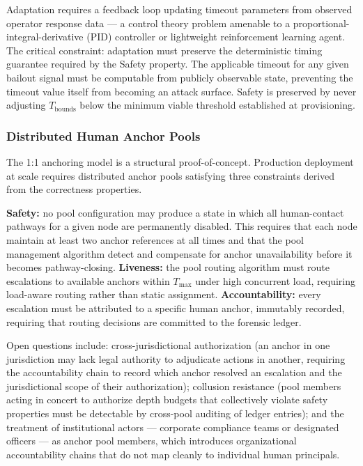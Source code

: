 Adaptation requires a feedback loop updating timeout parameters from observed operator response data --- a control theory problem amenable to a proportional-integral-derivative (PID) controller or lightweight reinforcement learning agent. The critical constraint: adaptation must preserve the deterministic timing guarantee required by the Safety property. The applicable timeout for any given bailout signal must be computable from publicly observable state, preventing the timeout value itself from becoming an attack surface. Safety is preserved by never adjusting $T_{\text{bounds}}$ below the minimum viable threshold established at provisioning.

\subsubsection{Distributed Human Anchor Pools}
\label{sec:future-anchor-pools}

The 1:1 anchoring model is a structural proof-of-concept. Production deployment at scale requires distributed anchor pools satisfying three constraints derived from the correctness properties.

\textbf{Safety:} no pool configuration may produce a state in which all human-contact pathways for a given node are permanently disabled. This requires that each node maintain at least two anchor references at all times and that the pool management algorithm detect and compensate for anchor unavailability before it becomes pathway-closing. \textbf{Liveness:} the pool routing algorithm must route escalations to available anchors within $T_{\max}$ under high concurrent load, requiring load-aware routing rather than static assignment. \textbf{Accountability:} every escalation must be attributed to a specific human anchor, immutably recorded, requiring that routing decisions are committed to the forensic ledger.

Open questions include: cross-jurisdictional authorization (an anchor in one jurisdiction may lack legal authority to adjudicate actions in another, requiring the accountability chain to record which anchor resolved an escalation and the jurisdictional scope of their authorization); collusion resistance (pool members acting in concert to authorize depth budgets that collectively violate safety properties must be detectable by cross-pool auditing of ledger entries); and the treatment of institutional actors --- corporate compliance teams or designated officers --- as anchor pool members, which introduces organizational accountability chains that do not map cleanly to individual human principals.

